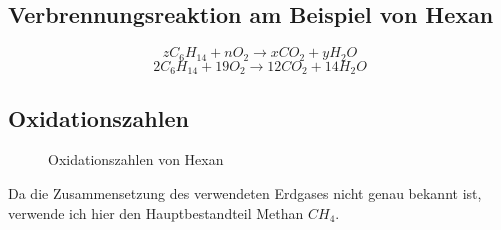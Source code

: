 \documentclass[11pt,paper=a4,final]{scrartcl}
\begin{document}
\subsection{Verbrennungsreaktion am Beispiel von Hexan}
\[zC_6H_{14} + nO_2 \to xCO_2 + yH_2O \]
\[2C_6H_{14} + 19O_2 \to 12CO_2 + 14H_2O \]
\subsection{Oxidationszahlen}
\begin{figure}[h!]
  \centering
  \caption{Oxidationszahlen von Hexan}
  \label{fig:}
\end{figure}

Da die Zusammensetzung des verwendeten Erdgases nicht genau bekannt ist,
verwende ich hier den Hauptbestandteil Methan \(CH_4\).
\begin{figure}[h!]
  \centering
  \caption{}
  \label{fig:}
\end{figure}



\newpage
\listoftables
{}

\end{document}
